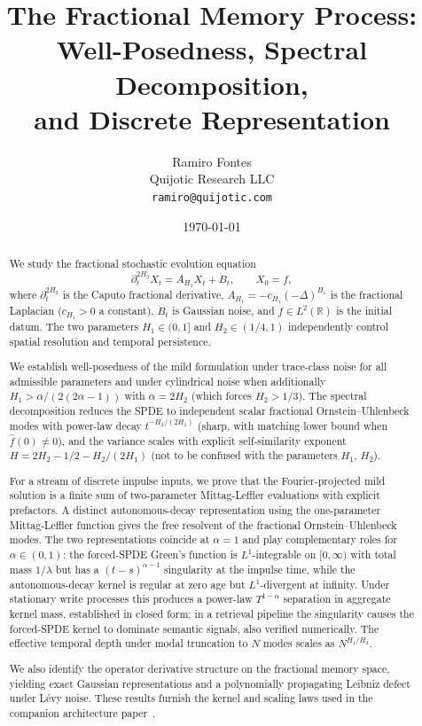 \documentclass[11pt]{article}
\title{The Fractional Memory Process:\\
Well-Posedness, Spectral Decomposition,\\
and Discrete Representation}
\author{Ramiro Fontes\\Quijotic Research LLC\\{\small\texttt{ramiro@quijotic.com}}}
\date{\today}
\theoremstyle{definition}
\theoremstyle{remark}
\newcommand{\R}{\mathbb{R}}
\begin{document}
\maketitle

\begin{abstract}
We study the fractional stochastic evolution equation
\[
\partial_t^{2H_2} X_t = A_{H_1} X_t + \dot{B}_t,
\qquad X_0 = f,
\]
where $\partial_t^{2H_2}$ is the Caputo fractional
derivative, $A_{H_1} = -c_{H_1}(-\Delta)^{H_1}$ is
the fractional Laplacian ($c_{H_1} > 0$ a constant),
$\dot{B}_t$ is Gaussian noise, and $f \in L^2(\R)$
is the initial datum.  The two parameters
$H_1 \in (0,1]$ and $H_2 \in (1/4,1)$ independently
control spatial resolution and temporal persistence.

We establish well-posedness of the mild formulation
under trace-class noise for all admissible parameters
and under cylindrical noise when additionally
$H_1 > \alpha/(2(2\alpha-1))$ with $\alpha = 2H_2$
(which forces $H_2 > 1/3$).  The spectral decomposition reduces the
SPDE to independent scalar fractional
Ornstein--Uhlenbeck modes with power-law decay
$t^{-H_2/(2H_1)}$ (sharp, with matching lower bound
when $\hat{f}(0) \neq 0$), and the variance scales
with explicit self-similarity exponent
$H = 2H_2 - 1/2 - H_2/(2H_1)$
(not to be confused with the parameters $H_1$, $H_2$).

For a stream of discrete impulse inputs, we prove
that the Fourier-projected mild solution is a
finite sum of two-parameter Mittag-Leffler
evaluations with explicit prefactors.  A distinct
autonomous-decay representation using the
one-parameter Mittag-Leffler function gives the
free resolvent of the fractional Ornstein--Uhlenbeck
modes.  The two representations coincide at
$\alpha = 1$ and play complementary roles for
$\alpha \in (0, 1)$: the forced-SPDE Green's
function is $L^1$-integrable on $[0, \infty)$ with
total mass $1/\lambda$ but has a $(t-s)^{\alpha-1}$
singularity at the impulse time, while the
autonomous-decay kernel is regular at zero age but
$L^1$-divergent at infinity.  Under stationary
write processes this produces a power-law
$T^{1-\alpha}$ separation in aggregate kernel mass,
established in closed form; in a retrieval pipeline the
singularity causes the forced-SPDE kernel to
dominate semantic signals, also verified
numerically.  The effective temporal depth under
modal truncation to $N$ modes scales as
$N^{H_1/H_2}$.

We also identify the operator derivative structure
on the fractional memory space, yielding exact
Gaussian representations and a polynomially
propagating Leibniz defect under L\'evy noise.
These results furnish the kernel and scaling laws
used in the companion architecture
paper~\cite{fontes2026arch}.
\end{abstract}
\end{document}
